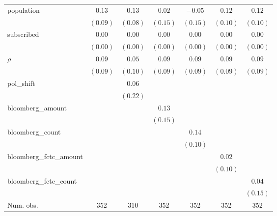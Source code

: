 \begin{table}[!h]
\begin{center}
\begin{tabular}{l c c c c c c }
population              & $0.13$       & $0.13$       & $0.02$       & $-0.05$      & $0.12$       & $0.12$       \\
                        & $(0.09)$     & $(0.08)$     & $(0.15)$     & $(0.15)$     & $(0.10)$     & $(0.10)$     \\
subscribed              & $0.00$       & $0.00$       & $0.00$       & $0.00$       & $0.00$       & $0.00$       \\
                        & $(0.00)$     & $(0.00)$     & $(0.00)$     & $(0.00)$     & $(0.00)$     & $(0.00)$     \\
$\rho$                  & $0.09$       & $0.05$       & $0.09$       & $0.09$       & $0.09$       & $0.09$       \\
                        & $(0.09)$     & $(0.10)$     & $(0.09)$     & $(0.09)$     & $(0.09)$     & $(0.09)$     \\
pol\_shift              &              & $0.06$       &              &              &              &              \\
                        &              & $(0.22)$     &              &              &              &              \\
bloomberg\_amount       &              &              & $0.13$       &              &              &              \\
                        &              &              & $(0.15)$     &              &              &              \\
bloomberg\_count        &              &              &              & $0.14$       &              &              \\
                        &              &              &              & $(0.10)$     &              &              \\
bloomberg\_fctc\_amount &              &              &              &              & $0.02$       &              \\
                        &              &              &              &              & $(0.10)$     &              \\
bloomberg\_fctc\_count  &              &              &              &              &              & $0.04$       \\
                        &              &              &              &              &              & $(0.15)$     \\
\midrule
Num. obs.               & 352          & 310          & 352          & 352          & 352          & 352          \\

\end{tabular}
\end{center}
\end{table}
